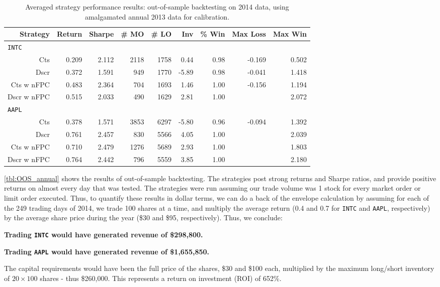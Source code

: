 \begin{table}
\centering
{}
\begin{tabular}{@{} *{9}{r} @{}}
\toprule
Strategy & Return & Sharpe & \# MO & \# LO & Inv & \% Win & Max Loss & Max Win \\
\midrule
\multicolumn{9}{l}{\texttt{INTC}} \\ 
Cts & 0.209 & 2.112 & 2118 & 1758 & 0.44 & 0.98 & -0.169 & 0.502 \\ 
Dscr & 0.372 & 1.591 & 949 & 1770 & -5.89 & 0.98 & -0.041 & 1.418 \\ 
Cts w nFPC & 0.483 & 2.364 & 704 & 1693 & 1.46 & 1.00 & -0.156 & 1.194 \\ 
Dscr w nFPC & 0.515 & 2.033 & 490 & 1629 & 2.81 & 1.00 &  & 2.072 \\  [2ex]
\multicolumn{9}{l}{\texttt{AAPL}} \\ 
Cts & 0.378 & 1.571 & 3853 & 6297 & -5.80 & 0.96 & -0.094 & 1.392 \\ 
Dscr & 0.761 & 2.457 & 830 & 5566 & 4.05 & 1.00 &  & 2.039 \\ 
Cts w nFPC & 0.710 & 2.479 & 1276 & 5689 & 2.93 & 1.00 &  & 1.803 \\ 
Dscr w nFPC & 0.764 & 2.442 & 796 & 5559 & 3.85 & 1.00 &  & 2.180 \\
\bottomrule
\end{tabular}
\caption{Averaged strategy performance results: out-of-sample backtesting on 2014 data, using amalgamated annual 2013 data for calibration.}
\label{tbl:OOS_annual}
\end{table}

\autoref{tbl:OOS_annual} shows the results of out-of-sample backtesting. The strategies post strong returns and Sharpe ratios, and provide positive returns on almost every day that was tested. The strategies were run assuming our trade volume was 1 stock for every market order or limit order executed. Thus, to quantify these results in dollar terms, we can do a back of the envelope calculation by assuming for each of the 249 trading days of 2014, we trade 100 shares at a time, and multiply the average return (0.4 and 0.7 for \texttt{INTC} and \texttt{AAPL}, respectively) by the average share price during the year (\$30 and \$95, respectively). Thus, we conclude:

\begin{center}
{\bf Trading \texttt{INTC} would have generated revenue of \$298,800.} \par
{\bf Trading \texttt{AAPL} would have generated revenue of \$1,655,850.}
\end{center}

The capital requirements would have been the full price of the shares, \$30 and \$100 each, multiplied by the maximum long/short inventory of $20 \times 100$ shares - thus \$260,000. This represents a return on investment (ROI) of 652\%.